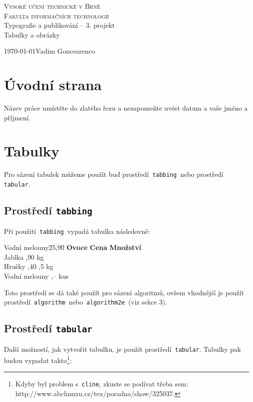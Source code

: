 \documentclass[a4paper, 11pt]{article}
\date{}
\begin{document}
\begin{center}
    \Huge
    \textsc{Vysoké učení technické v Brně\\\huge Fakulta informačních technologií}\\
    \LARGE
    Typografie a publikování – 3. projekt\\\Huge 
    Tabulky a obrázky
\end{center}
{\Large \today \hfill Vadim Goncearenco}
\newpage
{}
\section{Úvodní strana}
Název práce umístěte do zlatého řezu a nezapomeňte uvést  datum a vaše jméno a příjmení.
\section{Tabulky}
Pro sázení tabulek můžeme použít buď prostředí\texttt{ tabbing }nebo prostředí\texttt{ tabular}.
\subsection{Prostředí \texttt{tabbing}}
Při použití\texttt{ tabbing }vypadá tabulka následovně:

\begin{tabbing}
Vodní melouny\quad\=25,90\quad\=\kill
\textbf{Ovoce}    \>\textbf{Cena}       \>\textbf{Množství} \\
Jablka            ,90                kg              \\
Hrušky            ,40               ,5 kg            \\
Vodní melouny     ,\mbox{--}         kus             \\
\end{tabbing}

\noindent Toto prostředí se dá také použít pro sázení algoritmů, ovšem vhodnější je použít 
prostředí\texttt{ algorithm }nebo\texttt{ algorithm2e }(viz sekce 3).
\subsection{Prostředí \texttt{tabular}}
Další možností, jak vytvořit tabulku, je použít prostředí\texttt{ tabular}. Tabulky pak 
budou vypadat takto\footnote{Kdyby byl problem s\texttt{ cline}, zkuste se podívat třeba sem: http://www.abclinuxu.cz/tex/poradna/show/325037.}:
\end{document}
